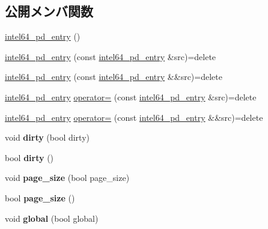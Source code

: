 \subsection*{公開メンバ関数}
\begin{DoxyCompactItemize}
\item 
\hyperlink{classintel64__pd__entry_a65857cd7c61a44f5e3431d28a4302ce0}{intel64\+\_\+pd\+\_\+entry} ()
\item 
\hyperlink{classintel64__pd__entry_a7e75916f391496e280a48a2e0975c256}{intel64\+\_\+pd\+\_\+entry} (const \hyperlink{classintel64__pd__entry}{intel64\+\_\+pd\+\_\+entry} \&src)=delete
\item 
\hyperlink{classintel64__pd__entry_a8d283c7b74a47f7ea2b0401e62c9c1f5}{intel64\+\_\+pd\+\_\+entry} (const \hyperlink{classintel64__pd__entry}{intel64\+\_\+pd\+\_\+entry} \&\&src)=delete
\item 
\hyperlink{classintel64__pd__entry}{intel64\+\_\+pd\+\_\+entry} \hyperlink{classintel64__pd__entry_ac43293f1913f7b0defc09fddc4d41c42}{operator=} (const \hyperlink{classintel64__pd__entry}{intel64\+\_\+pd\+\_\+entry} \&src)=delete
\item 
\hyperlink{classintel64__pd__entry}{intel64\+\_\+pd\+\_\+entry} \hyperlink{classintel64__pd__entry_a7c1b852616a6ae19011ba5ab8d3723ed}{operator=} (const \hyperlink{classintel64__pd__entry}{intel64\+\_\+pd\+\_\+entry} \&\&src)=delete
\item 
\hypertarget{classintel64__pd__entry_afa5cd8baf3b1d7445d1f88da0b8a2211}{}\label{classintel64__pd__entry_afa5cd8baf3b1d7445d1f88da0b8a2211} 
void {\bfseries dirty} (bool dirty)
\item 
\hypertarget{classintel64__pd__entry_a1a1543ea38de92711606c51620c08558}{}\label{classintel64__pd__entry_a1a1543ea38de92711606c51620c08558} 
bool {\bfseries dirty} ()
\item 
\hypertarget{classintel64__pd__entry_afd12d3fb710982d226307c2001cbae69}{}\label{classintel64__pd__entry_afd12d3fb710982d226307c2001cbae69} 
void {\bfseries page\+\_\+size} (bool page\+\_\+size)
\item 
\hypertarget{classintel64__pd__entry_a749a18ca2604bf41456351f8dc9ee44c}{}\label{classintel64__pd__entry_a749a18ca2604bf41456351f8dc9ee44c} 
bool {\bfseries page\+\_\+size} ()
\item 
\hypertarget{classintel64__pd__entry_acf431ef25bf4f174d4e412e4569767e3}{}\label{classintel64__pd__entry_acf431ef25bf4f174d4e412e4569767e3} 
void {\bfseries global} (bool global)
\item 
\hypertarget{classintel64__pd__entry_a12731466c013a12014370848d4123c85}{}\label{classintel64__pd__entry_a12731466c013a12014370848d4123c85} 

\end{DoxyCompactItemize}
